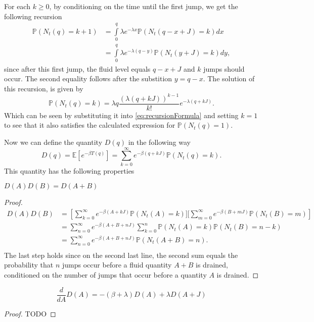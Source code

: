 For each $k\geq0$, by conditioning on the time until the first jump, we get the following recursion
\begin{equation}\label{eq:recursionFormula}
\begin{split}
\mathbb{P}(N_t(q)=k+1)&=\int\limits_0^{q}\lambda e^{-\lambda x}\mathbb{P}(N_t(q-x+J)=k)dx\\
&=\int\limits_0^{q}\lambda e^{-\lambda (q-y)}\mathbb{P}(N_t(y+J)=k)dy,
\end{split}
\end{equation}
since after this first jump, the fluid level equals $q-x+J$ and $k$ jumps should occur. The second equality follows after the substition $y=q-x$.
The solution of this recursion, is given by
$$
\mathbb{P}(N_t(q)=k)=\lambda q\frac{(\lambda (q+kJ))^{k-1}}{k!}e^{-\lambda(q+kJ)}.
$$
Which can be seen by substituting it into \eqref{eq:recursionFormula} and setting $k=1$ to see that it also satisfies the calculated expression for $\mathbb{P}(N_t(q)=1)$.

Now we can define the quantity $D(q)$ in the following way
$$
D(q)=\mathbb{E}[e^{-\beta T(q)}]=\sum\limits_{k=0}^\infty e^{-\beta(q+kJ)}\mathbb{P}(N_t(q)=k).
$$
This quantity has the following properties
\begin{lemma}
$D(A)D(B)=D(A+B)$
\end{lemma}
\begin{proof}
\begin{equation}
\begin{split}
D(A)D(B)&=\left[\sum\limits_{k=0}^\infty e^{-\beta(A+kJ)}\mathbb{P}(N_t(A)=k)][\sum\limits_{m=0}^\infty e^{-\beta(B+mJ)}\mathbb{P}(N_t(B)=m)\right]\\
&=\sum\limits_{n=0}^\infty e^{-\beta(A+B+nJ)}\sum\limits_{k=0}^n \mathbb{P}(N_t(A)=k)\mathbb{P}(N_t(B)=n-k)\\
&=\sum\limits_{n=0}^\infty e^{-\beta(A+B+nJ)} \mathbb{P}(N_t(A+B)=n).\\
\end{split}
\end{equation}
The last step holds since on the second last line, the second sum equals the probability that $n$ jumps occur before a fluid quantity $A+B$ is drained, conditioned on the number of jumps that occur before a quantity $A$ is drained.
\end{proof}

\begin{lemma}
$$\frac{d}{dA}D(A)=-(\beta+\lambda)D(A)+\lambda D(A+J)$$
\end{lemma}
\begin{proof}
TODO
\end{proof}

